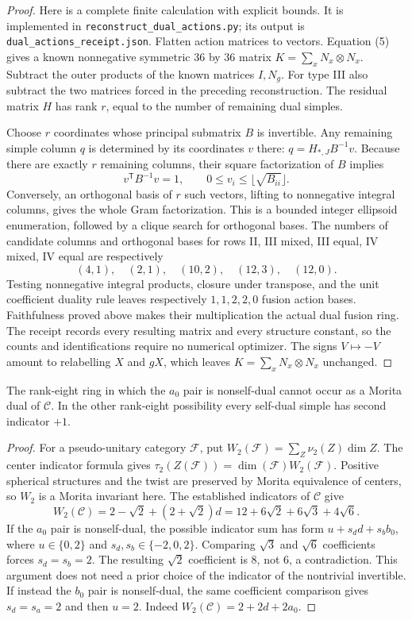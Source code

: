 \documentclass[11pt]{article}
\newcommand{\C}{\mathcal C}\newcommand{\I}{\mathcal I}\newcommand{\M}{\mathcal M}
\begin{document}
\begin{proof}
Here is a complete finite calculation with explicit bounds. It is
implemented in \texttt{reconstruct\_dual\_actions.py}; its output is
\texttt{dual\_actions\_receipt.json}. Flatten action matrices to vectors.
Equation (5) gives a known nonnegative symmetric $36$ by $36$ matrix
$K=\sum_x N_x\otimes N_x$. Subtract the outer products of the known
matrices $I,N_g$. For type III also subtract the two matrices forced in
the preceding reconstruction. The residual matrix $H$ has rank $r$,
equal to the number of remaining dual simples.

Choose $r$ coordinates whose principal submatrix $B$ is invertible.
Any remaining simple column $q$ is determined by its coordinates $v$
there: $q=H_{*,J}B^{-1}v$. Because there are exactly $r$ remaining
columns, their square factorization of $B$ implies
\[
v^{\mathsf T}B^{-1}v=1,
\qquad 0\leq v_i\leq\lfloor\sqrt{B_{ii}}\rfloor.
\]
Conversely, an orthogonal basis of $r$ such vectors, lifting to
nonnegative integral columns, gives the whole Gram factorization.
This is a bounded integer ellipsoid enumeration, followed by a clique
search for orthogonal bases. The numbers of candidate columns and
orthogonal bases for rows II, III mixed, III equal, IV mixed, IV equal
are respectively
\[
(4,1),\quad(2,1),\quad(10,2),\quad(12,3),\quad(12,0).
\]
Testing nonnegative integral products, closure under transpose, and the
unit coefficient duality rule leaves respectively $1,1,2,2,0$ fusion
action bases. Faithfulness proved above makes their multiplication the
actual dual fusion ring. The receipt records every resulting matrix
and every structure constant, so the counts and identifications require
no numerical optimizer. The signs $V\mapsto -V$ amount to relabelling
$X$ and $gX$, which leaves $K=\sum_xN_x\otimes N_x$ unchanged.
\end{proof}

\begin{corollary}
The rank-eight ring in which the $a_0$ pair is nonself-dual cannot occur
as a Morita dual of $\C$. In the other rank-eight possibility every
self-dual simple has second indicator $+1$.
\end{corollary}
\begin{proof}
For a pseudo-unitary category $\mathcal F$, put
$W_2(\mathcal F)=\sum_Z\nu_2(Z)\dim Z$.
The center indicator formula gives
$\tau_2(Z(\mathcal F))=\dim(\mathcal F)W_2(\mathcal F)$.
Positive spherical structures and the twist are preserved by Morita
equivalence of centers, so $W_2$ is a Morita invariant here. The
established indicators of $\C$ give
\[
W_2(\C)=2-\sqrt2+(2+\sqrt2)d
       =12+6\sqrt2+6\sqrt3+4\sqrt6.
\]
If the $a_0$ pair is nonself-dual, the possible indicator sum has form
$u+s_d d+s_b b_0$, where $u\in\{0,2\}$ and
$s_d,s_b\in\{-2,0,2\}$. Comparing $\sqrt3$ and $\sqrt6$
coefficients forces $s_d=s_b=2$. The resulting $\sqrt2$ coefficient
is $8$, not $6$, a contradiction. This argument does not need a prior
choice of the indicator of the nontrivial invertible.
If instead the $b_0$ pair is nonself-dual, the same coefficient
comparison gives $s_d=s_a=2$ and then $u=2$.
Indeed $W_2(\C)=2+2d+2a_0$.
\end{proof}
\end{document}
